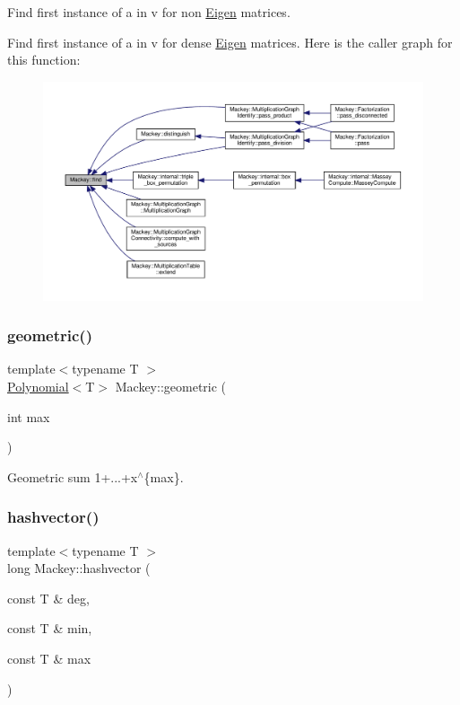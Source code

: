 Find first instance of a in v for non \hyperlink{namespaceEigen}{Eigen} matrices. 

Find first instance of a in v for dense \hyperlink{namespaceEigen}{Eigen} matrices. Here is the caller graph for this function\+:\nopagebreak
\begin{figure}[H]
\begin{center}
\leavevmode
\includegraphics[width=350pt]{namespaceMackey_a91104eaef1ab349e68f0623cfaaf45c0_icgraph}
\end{center}
\end{figure}
\mbox{\label{namespaceMackey_a2b9319a9af0a3cad8cfec47e9197dc82}} 
\subsubsection{\texorpdfstring{geometric()}{geometric()}}
{\footnotesize\ttfamily template$<$typename T $>$ \\
\hyperlink{classMackey_1_1Polynomial}{Polynomial}$<$T$>$ Mackey\+::geometric (\begin{DoxyParamCaption}\item[{int}]{max }\end{DoxyParamCaption})}



Geometric sum 1+...+x$^\wedge$\{max\}. 

\mbox{\label{namespaceMackey_a3d23281b881eb1f166107b333fa98612}} 
\subsubsection{\texorpdfstring{hashvector()}{hashvector()}}
{\footnotesize\ttfamily template$<$typename T $>$ \\
long Mackey\+::hashvector (\begin{DoxyParamCaption}\item[{const T \&}]{deg,  }\item[{const T \&}]{min,  }\item[{const T \&}]{max }\end{DoxyParamCaption})}



